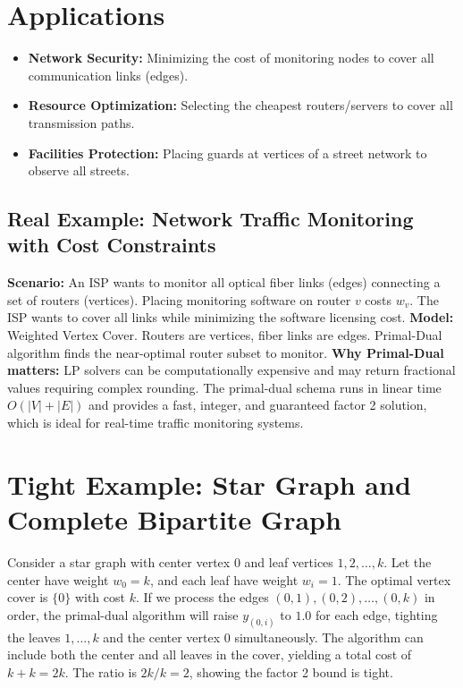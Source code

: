 \documentclass[11pt,oneside]{book}
\begin{document}
\section{Applications}
\begin{itemize}
    \item \textbf{Network Security:} Minimizing the cost of monitoring nodes to cover all communication links (edges).
    \item \textbf{Resource Optimization:} Selecting the cheapest routers/servers to cover all transmission paths.
    \item \textbf{Facilities Protection:} Placing guards at vertices of a street network to observe all streets.
\end{itemize}

\subsection*{Real Example: Network Traffic Monitoring with Cost Constraints}
\textbf{Scenario:} An ISP wants to monitor all optical fiber links (edges) connecting a set of routers (vertices). Placing monitoring software on router $v$ costs $w_v$. The ISP wants to cover all links while minimizing the software licensing cost.
\textbf{Model:} Weighted Vertex Cover. Routers are vertices, fiber links are edges. Primal-Dual algorithm finds the near-optimal router subset to monitor.
\textbf{Why Primal-Dual matters:} LP solvers can be computationally expensive and may return fractional values requiring complex rounding. The primal-dual schema runs in linear time $O(|V| + |E|)$ and provides a fast, integer, and guaranteed factor 2 solution, which is ideal for real-time traffic monitoring systems.

\section{Tight Example: Star Graph and Complete Bipartite Graph}
Consider a star graph with center vertex $0$ and leaf vertices $1, 2, \dots, k$. Let the center have weight $w_0 = k$, and each leaf have weight $w_i = 1$. The optimal vertex cover is $\{0\}$ with cost $k$.
If we process the edges $(0, 1), (0, 2), \dots, (0, k)$ in order, the primal-dual algorithm will raise $y_{(0,i)}$ to $1.0$ for each edge, tighting the leaves $1, \dots, k$ and the center vertex $0$ simultaneously. The algorithm can include both the center and all leaves in the cover, yielding a total cost of $k + k = 2k$. The ratio is $2k / k = 2$, showing the factor 2 bound is tight.
\end{document}
